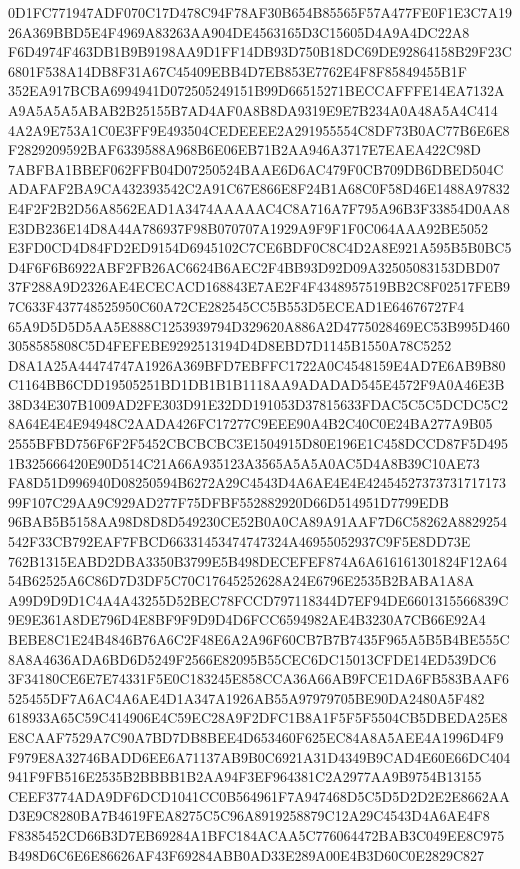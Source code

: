 \documentclass[UTF8,fontset=fandol,zihao=-4,a4paper]{ctexart}
\begin{document}
{{0D1FC771947ADF070C17D478C94F78AF30B654B85565F57A477FE0F1E3C7A1926A369BBD5E4F4969A83263AA904DE4563165D3C15605D4A9A4DC22A8
F6D4974F463DB1B9B9198AA9D1FF14DB93D750B18DC69DE92864158B29F23C6801F538A14DB8F31A67C45409EBB4D7EB853E7762E4F8F85849455B1F
352EA917BCBA6994941D072505249151B99D66515271BECCAFFFE14EA7132AA9A5A5A5ABAB2B25155B7AD4AF0A8B8DA9319E9E7B234A0A48A5A4C414
4A2A9E753A1C0E3FF9E493504CEDEEEE2A291955554C8DF73B0AC77B6E6E8F2829209592BAF6339588A968B6E06EB71B2AA946A3717E7EAEA422C98D
7ABFBA1BBEF062FFB04D07250524BAAE6D6AC479F0CB709DB6DBED504CADAFAF2BA9CA432393542C2A91C67E866E8F24B1A68C0F58D46E1488A97832
E4F2F2B2D56A8562EAD1A3474AAAAAC4C8A716A7F795A96B3F33854D0AA8E3DB236E14D8A44A786937F98B070707A1929A9F9F1F0C064AAA92BE5052
E3FD0CD4D84FD2ED9154D6945102C7CE6BDF0C8C4D2A8E921A595B5B0BC5D4F6F6B6922ABF2FB26AC6624B6AEC2F4BB93D92D09A32505083153DBD07
37F288A9D2326AE4ECECACD168843E7AE2F4F4348957519BB2C8F02517FEB97C633F437748525950C60A72CE282545CC5B553D5ECEAD1E64676727F4
65A9D5D5D5AA5E888C1253939794D329620A886A2D4775028469EC53B995D4603058585808C5D4FEFEBE9292513194D4D8EBD7D1145B1550A78C5252
D8A1A25A44474747A1926A369BFD7EBFFC1722A0C4548159E4AD7E6AB9B80C1164BB6CDD19505251BD1DB1B1B1118AA9ADADAD545E4572F9A0A46E3B
38D34E307B1009AD2FE303D91E32DD191053D37815633FDAC5C5C5DCDC5C28A64E4E4E94948C2AADA426FC17277C9EEE90A4B2C40C0E24BA277A9B05
2555BFBD756F6F2F5452CBCBCBC3E1504915D80E196E1C458DCCD87F5D4951B325666420E90D514C21A66A935123A3565A5A5A0AC5D4A8B39C10AE73
FA8D51D996940D08250594B6272A29C4543D4A6AE4E4E4245452737373171717399F107C29AA9C929AD277F75DFBF552882920D66D514951D7799EDB
96BAB5B5158AA98D8D8D549230CE52B0A0CA89A91AAF7D6C58262A8829254542F33CB792EAF7FBCD66331453474747324A46955052937C9F5E8DD73E
762B1315EABD2DBA3350B3799E5B498DECEFEF874A6A616161301824F12A6454B62525A6C86D7D3DF5C70C17645252628A24E6796E2535B2BABA1A8A
A99D9D9D1C4A4A43255D52BEC78FCCD797118344D7EF94DE6601315566839C9E9E361A8DE796D4E8BF9F9D9D4D6FCC6594982AE4B3230A7CB66E92A4
BEBE8C1E24B4846B76A6C2F48E6A2A96F60CB7B7B7435F965A5B5B4BE555C8A8A4636ADA6BD6D5249F2566E82095B55CEC6DC15013CFDE14ED539DC6
3F34180CE6E7E74331F5E0C183245E858CCA36A66AB9FCE1DA6FB583BAAF6525455DF7A6AC4A6AE4D1A347A1926AB55A97979705BE90DA2480A5F482
618933A65C59C414906E4C59EC28A9F2DFC1B8A1F5F5F5504CB5DBEDA25E8E8CAAF7529A7C90A7BD7DB8BEE4D653460F625EC84A8A5AEE4A1996D4F9
F979E8A32746BADD6EE6A71137AB9B0C6921A31D4349B9CAD4E60E66DC404941F9FB516E2535B2BBBB1B2AA94F3EF964381C2A2977AA9B9754B13155
CEEF3774ADA9DF6DCD1041CC0B564961F7A947468D5C5D5D2D2E2E8662AAD3E9C8280BA7B4619FEA8275C5C96A8919258879C12A29C4543D4A6AE4F8
F8385452CD66B3D7EB69284A1BFC184ACAA5C776064472BAB3C049EE8C975B498D6C6E6E86626AF43F69284ABB0AD33E289A00E4B3D60C0E2829C827
}}
\end{document}
